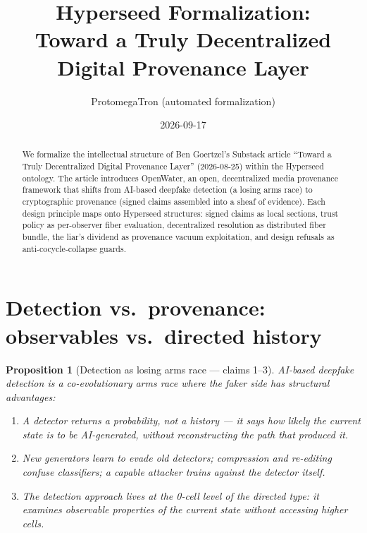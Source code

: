 \documentclass[11pt,a4paper]{article}
\title{Hyperseed Formalization:\\
  Toward a Truly Decentralized Digital Provenance Layer}
\author{ProtomegaTron (automated formalization)}
\date{2026-09-17}
\newtheorem{proposition}[definition]{Proposition}
\begin{document}
\maketitle

\begin{abstract}
We formalize the intellectual structure of Ben Goertzel's Substack article
``Toward a Truly Decentralized Digital Provenance Layer'' (2026-08-25) within
the Hyperseed ontology. The article introduces OpenWater, an open,
decentralized media provenance framework that shifts from AI-based deepfake
detection (a losing arms race) to cryptographic provenance (signed claims
assembled into a sheaf of evidence). Each design principle maps onto
Hyperseed structures: signed claims as local sections, trust policy as
per-observer fiber evaluation, decentralized resolution as distributed
fiber bundle, the liar's dividend as provenance vacuum exploitation, and
design refusals as anti-cocycle-collapse guards.
\end{abstract}

\tableofcontents

\section{Detection vs.\ provenance: observables vs.\ directed history}
\label{sec:detection}

\begin{proposition}[Detection as losing arms race --- claims 1--3]
\label{prop:arms-race}
AI-based deepfake detection is a co-evolutionary arms race where the
faker side has structural advantages:
\begin{enumerate}
\item A detector returns a probability, not a history --- it says how
  likely the current state is to be AI-generated, without reconstructing
  the path that produced it.
\item New generators learn to evade old detectors; compression and
  re-editing confuse classifiers; a capable attacker trains against the
  detector itself.
\item The detection approach lives at the 0-cell level of the directed
  type: it examines observable properties of the current state without
  accessing higher cells.
\end{enumerate}
\end{proposition}
\end{document}
